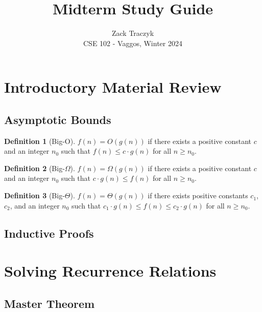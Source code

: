 \documentclass[12pt]{article}
\title{Midterm Study Guide}
\author{Zack Traczyk \\ CSE 102 - Vaggos, Winter 2024}
\date{}
\theoremstyle{definition}
\newtheorem{definition}{Definition}
\begin{document}
	\maketitle

	\tableofcontents

	\pagebreak



	\section{Introductory Material Review}

	\subsection{Asymptotic Bounds}

	\begin{definition}[Big-O]
		$f(n) = O(g(n))$ if there exists a positive constant $c$ and an integer
		$n_0$ such that $f(n) \leq c \cdot g(n)$ for all $n \geq n_0$.
	\end{definition}

	\begin{definition}[Big-$\Omega$]
		$f(n) = \Omega(g(n))$ if there exists a positive constant $c$ and an
		integer $n_0$ such that $c \cdot g(n) \leq f(n)$ for all $n \geq n_0$.
	\end{definition}

	\begin{definition}[Big-$\Theta$]
		$f(n) = \Theta(g(n))$ if there exists positive constants $c_1$, $c_2$,
		and an integer $n_0$ such that $c_1 \cdot g(n) \leq f(n) \leq c_2 \cdot
		g(n)$ for all $n \geq n_0$.
	\end{definition}

	\subsection{Inductive Proofs}


	\section{Solving Recurrence Relations}

	\subsection{Master Theorem}
\end{document}
